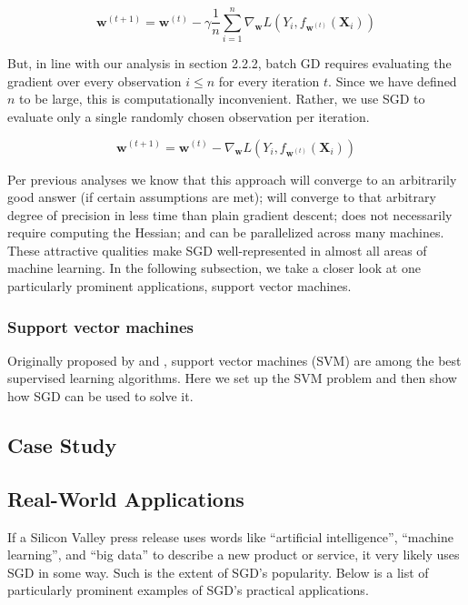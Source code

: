 \documentclass{article}
\begin{document}
\begin{equation}
	\bm{w}^{(t+1)} = \bm{w}^{(t)} - \gamma \frac{1}{n}\sum_{i=1}^n
	\nabla_{\bm{w}} L(Y_i, f_{\bm{w}^{(t)}}(\bm{X}_i))
\end{equation}

But, in line with our analysis in section 2.2.2, batch GD requires evaluating
the gradient over every observation $i \leq n$ for every iteration $t$. Since we have defined $n$ to be
large, this is computationally inconvenient. Rather, we use SGD to evaluate only
a single randomly chosen observation per iteration.

\begin{equation}
	\bm{w}^{(t+1)} = \bm{w}^{(t)} - \nabla_{\bm{w}} L(Y_i, f_{\bm{w}^{(t)}}(\bm{X}_i))
\end{equation}

Per previous analyses we know that this approach will converge to an arbitrarily
good answer (if certain assumptions are met); will converge to that arbitrary
degree of precision in less time than plain gradient descent; does not
necessarily require computing the Hessian; and can be parallelized across many
machines. These attractive qualities make SGD well-represented in almost all areas of
machine learning. In the following subsection, we take a closer look at one
particularly prominent applications, support vector machines.

\subsubsection{Support vector machines}

Originally proposed by \cite{boser1992training} and \cite{cortes1995support}, support vector machines (SVM)
are among the best supervised learning algorithms. Here we set up the SVM
problem and then show how SGD can be used to solve it.

\cite{shalev2011pegasos}

\subsection{Case Study}

\cite{dal2015calibrating}

\subsection{Real-World Applications}

If a Silicon Valley press release uses words like ``artificial intelligence'',
``machine learning'', and ``big data'' to describe a new product or service, it very likely
uses SGD in some way. Such is the extent of SGD's popularity. 
Below is a list of particularly prominent examples of SGD's practical
applications.
\end{document}
